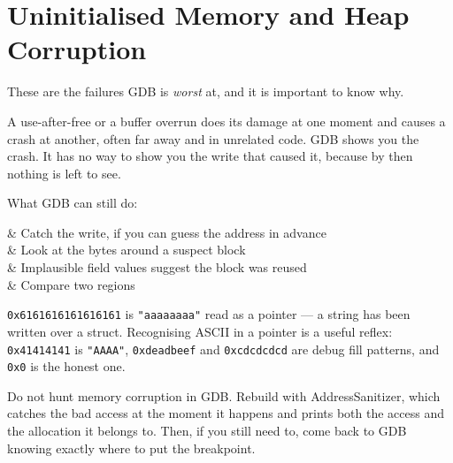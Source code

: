 \section{Uninitialised Memory and Heap Corruption}\label{sec:gdb-memory}

These are the failures GDB is \emph{worst} at, and it is important to know why.

\begin{intuition}
	A use-after-free or a buffer overrun does its damage at one moment and causes a
	crash at another, often far away and in unrelated code. GDB shows you the
	crash. It has no way to show you the write that caused it, because by then
	nothing is left to see.
\end{intuition}

What GDB can still do:

\begin{keys}[0.30]
	      & Catch the write, if you can guess the address in advance \\
	        & Look at the bytes around a suspect block                 \\
	           & Implausible field values suggest the block was reused    \\
	 & Compare two regions                                    \\
\end{keys}


\begin{note}
	\texttt{0x6161616161616161} is \texttt{"aaaaaaaa"} read as a pointer --- a
	string has been written over a struct. Recognising ASCII in a pointer is a
	useful reflex: \texttt{0x41414141} is \texttt{"AAAA"},
	\texttt{0xdeadbeef} and \texttt{0xcdcdcdcd} are debug fill patterns, and
	\texttt{0x0} is the honest one.
\end{note}

\begin{moral}
	Do not hunt memory corruption in GDB. Rebuild with AddressSanitizer, which
	catches the bad access at the moment it happens and prints both the access and
	the allocation it belongs to. Then, if you still need to, come back to GDB
	knowing exactly where to put the breakpoint.
\end{moral}

